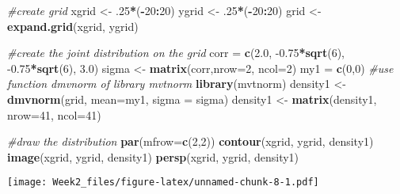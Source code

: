 \documentclass[]{article}
\newenvironment{Shaded}{\begin{snugshade}}{\end{snugshade}}
\newcommand{\CommentTok}[1]{\textcolor[rgb]{0.56,0.35,0.01}{\textit{#1}}}
\newcommand{\DataTypeTok}[1]{\textcolor[rgb]{0.13,0.29,0.53}{#1}}
\newcommand{\DecValTok}[1]{\textcolor[rgb]{0.00,0.00,0.81}{#1}}
\newcommand{\FloatTok}[1]{\textcolor[rgb]{0.00,0.00,0.81}{#1}}
\newcommand{\KeywordTok}[1]{\textcolor[rgb]{0.13,0.29,0.53}{\textbf{#1}}}
\newcommand{\NormalTok}[1]{#1}
\newcommand{\OperatorTok}[1]{\textcolor[rgb]{0.81,0.36,0.00}{\textbf{#1}}}
\newcommand{\StringTok}[1]{\textcolor[rgb]{0.31,0.60,0.02}{#1}}
\begin{document}
\begin{Shaded}
\begin{Highlighting}[]
\CommentTok{#create grid }
\NormalTok{xgrid <-}\StringTok{ }\FloatTok{.25}\OperatorTok{*}\NormalTok{(}\OperatorTok{-}\DecValTok{20}\OperatorTok{:}\DecValTok{20}\NormalTok{)}
\NormalTok{ygrid <-}\StringTok{ }\FloatTok{.25}\OperatorTok{*}\NormalTok{(}\OperatorTok{-}\DecValTok{20}\OperatorTok{:}\DecValTok{20}\NormalTok{)}
\NormalTok{grid <-}\StringTok{ }\KeywordTok{expand.grid}\NormalTok{(xgrid, ygrid)}

\CommentTok{#create the joint distribution on the grid}
\NormalTok{corr =}\StringTok{ }\KeywordTok{c}\NormalTok{(}\FloatTok{2.0}\NormalTok{, }\FloatTok{-0.75}\OperatorTok{*}\KeywordTok{sqrt}\NormalTok{(}\DecValTok{6}\NormalTok{), }\FloatTok{-0.75}\OperatorTok{*}\KeywordTok{sqrt}\NormalTok{(}\DecValTok{6}\NormalTok{), }\FloatTok{3.0}\NormalTok{)}
\NormalTok{sigma <-}\StringTok{ }\KeywordTok{matrix}\NormalTok{(corr,}\DataTypeTok{nrow=}\DecValTok{2}\NormalTok{, }\DataTypeTok{ncol=}\DecValTok{2}\NormalTok{)}
\NormalTok{my1 =}\StringTok{ }\KeywordTok{c}\NormalTok{(}\DecValTok{0}\NormalTok{,}\DecValTok{0}\NormalTok{)}
\CommentTok{#use function dmvnorm of library mvtnorm}
\KeywordTok{library}\NormalTok{(mvtnorm)}
\NormalTok{density1 <-}\StringTok{ }\KeywordTok{dmvnorm}\NormalTok{(grid, }\DataTypeTok{mean=}\NormalTok{my1, }\DataTypeTok{sigma =}\NormalTok{ sigma)}
\NormalTok{density1 <-}\StringTok{ }\KeywordTok{matrix}\NormalTok{(density1, }\DataTypeTok{nrow=}\DecValTok{41}\NormalTok{, }\DataTypeTok{ncol=}\DecValTok{41}\NormalTok{)}

\CommentTok{#draw the distribution}
\KeywordTok{par}\NormalTok{(}\DataTypeTok{mfrow=}\KeywordTok{c}\NormalTok{(}\DecValTok{2}\NormalTok{,}\DecValTok{2}\NormalTok{))}
\KeywordTok{contour}\NormalTok{(xgrid, ygrid, density1)}
\KeywordTok{image}\NormalTok{(xgrid, ygrid, density1)}
\KeywordTok{persp}\NormalTok{(xgrid, ygrid, density1)}
\end{Highlighting}
\end{Shaded}

\texttt{[image: Week2\_files/figure-latex/unnamed-chunk-8-1.pdf]}
\end{document}
